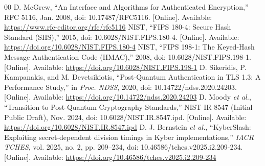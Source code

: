 \documentclass[journal, 10pt]{IEEEtran}
\begin{document}
\begin{thebibliography}{00}
 D. McGrew, ``An Interface and Algorithms for Authenticated Encryption,'' RFC 5116, Jan. 2008, doi: 10.17487/RFC5116. [Online]. Available: \url{https://www.rfc-editor.org/rfc/rfc5116}
 NIST, ``FIPS 180-4: Secure Hash Standard (SHS),'' 2015, doi: 10.6028/NIST.FIPS.180-4. [Online]. Available: \url{https://doi.org/10.6028/NIST.FIPS.180-4}
 NIST, ``FIPS 198-1: The Keyed-Hash Message Authentication Code (HMAC),'' 2008, doi: 10.6028/NIST.FIPS.198-1. [Online]. Available: \url{https://doi.org/10.6028/NIST.FIPS.198-1}
 D. Sikeridis, P. Kampanakis, and M. Devetsikiotis, ``Post-Quantum Authentication in TLS 1.3: A Performance Study,'' in \textit{Proc. NDSS}, 2020, doi: 10.14722/ndss.2020.24203. [Online]. Available: \url{https://doi.org/10.14722/ndss.2020.24203}
 D. Moody \textit{et al.}, ``Transition to Post-Quantum Cryptography Standards,'' NIST IR 8547 (Initial Public Draft), Nov. 2024, doi: 10.6028/NIST.IR.8547.ipd. [Online]. Available: \url{https://doi.org/10.6028/NIST.IR.8547.ipd}
 D. J. Bernstein \textit{et al.}, ``KyberSlash: Exploiting secret-dependent division timings in Kyber implementations,'' \textit{IACR TCHES}, vol. 2025, no. 2, pp. 209--234, doi: 10.46586/tches.v2025.i2.209-234. [Online]. Available: \url{https://doi.org/10.46586/tches.v2025.i2.209-234}
\end{thebibliography}
\end{document}
